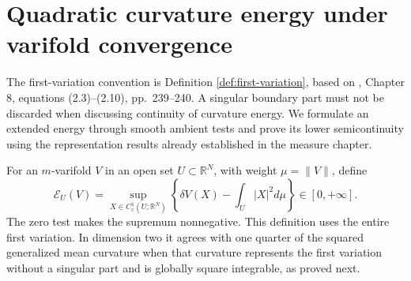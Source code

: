 \chapter{Quadratic curvature energy under varifold convergence}\label{sec:willmore-varifold-energy}
The first-variation convention is Definition \ref{def:first-variation}, based on \cite{Sim18}, Chapter 8, equations (2.3)--(2.10), pp.~239--240. A singular boundary part must not be discarded when discussing continuity of curvature energy. We formulate an extended energy through smooth ambient tests and prove its lower semicontinuity using the representation results already established in the measure chapter.

\begin{definition}\label{def:varifold-quadratic-energy}
For an $m$-varifold $V$ in an open set $U\subset\mathbb R^N$, with weight $\mu=\|V\|$, define
\[
 \mathcal E_U(V)=\sup_{X\in C_c^1(U;\mathbb R^N)}
 \left\{\delta V(X)-\int_U|X|^2d\mu\right\}\in[0,+\infty].
\]
The zero test makes the supremum nonnegative. This definition uses the entire first variation. In dimension two it agrees with one quarter of the squared generalized mean curvature when that curvature represents the first variation without a singular part and is globally square integrable, as proved next.
\end{definition}

